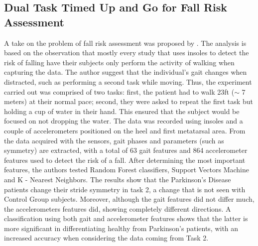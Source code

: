 \subsection{Dual Task Timed Up and Go for Fall Risk Assessment}
A take on the problem of fall risk assessment was proposed by \cite{ParkinsonCupOWater}. The analysis is based on the observation that mostly every study that uses insoles to detect the risk of falling have their subjects only perform the activity of walking when capturing the data. The author suggest that the individual's gait changes when distracted, such as performing a second task while moving. 
Thus, the experiment carried out was comprised of two tasks: first, the patient had to walk 23ft ($\sim$ 7 meters) at their normal pace; second, they were asked to repeat the first task but holding a cup of water in their hand. This ensured that the subject would be focused on not dropping the water.
The data was recorded using insoles and a couple of accelerometers positioned on the heel and first metatarsal area. 
From the data acquired with the sensors, gait phases and parameters (such as symmetry) are extracted, with a total of 63 gait features and 864 accelerometer features used to detect the risk of a fall. After determining the most important features, the authors tested Random Forest classifiers, Support Vectors Machine and K - Nearest Neighbors.
The results show that the Parkinson's Disease patients change their stride symmetry in task 2, a change that is not seen with Control Group subjects.
Moreover, although the gait features did not differ much, the accelerometers features did, showing completely different directions. A classification using both gait and accelerometer features shows that the latter is more significant in differentiating healthy from Parkinson's patients, with an increased accuracy when considering the data coming from Task 2.

